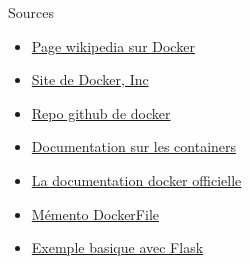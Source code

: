  \begin{frame}{Sources}
 \begin{itemize}
     \item \href{https://en.wikipedia.org/wiki/Docker_(software)}{Page wikipedia sur Docker}
     \item \href{https://www.docker.com/}{Site de Docker, Inc}
     \item \href{https://github.com/docker/docker-ce}{Repo github de docker}
     \item \href{https://www.aquasec.com/wiki/display/containers/}{Documentation sur les containers}
     \item \href{https://docs.docker.com/develop}{La documentation docker officielle}
     \item \href{https://kapeli.com/cheat_sheets/Dockerfile.docset/Contents/Resources/Documents/index}{Mémento DockerFile}
     \item \href{https://runnable.com/docker/python/dockerize-your-flask-application}{Exemple basique avec Flask}
 \end{itemize}
 \end{frame}
